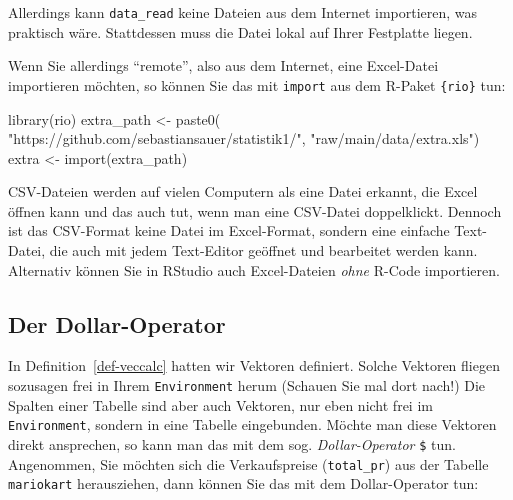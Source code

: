 \documentclass[
  letterpaper,
  oneside,
  open=any]{scrbook}
\newenvironment{Shaded}{\begin{snugshade}}{\end{snugshade}}
\newcommand{\DocumentationTok}[1]{\textcolor[rgb]{0.37,0.37,0.37}{\textit{#1}}}
\newcommand{\FunctionTok}[1]{\textcolor[rgb]{0.28,0.35,0.67}{#1}}
\newcommand{\NormalTok}[1]{\textcolor[rgb]{0.00,0.23,0.31}{#1}}
\newcommand{\OtherTok}[1]{\textcolor[rgb]{0.00,0.23,0.31}{#1}}
\newcommand{\SpecialCharTok}[1]{\textcolor[rgb]{0.37,0.37,0.37}{#1}}
\newcommand{\StringTok}[1]{\textcolor[rgb]{0.13,0.47,0.30}{#1}}
\theoremstyle{definition}
\theoremstyle{definition}
\theoremstyle{definition}
\theoremstyle{remark}
\begin{document}
Allerdings kann \texttt{data\_read} keine Dateien aus dem Internet
importieren, was praktisch wäre. Stattdessen muss die Datei lokal auf
Ihrer Festplatte liegen.

Wenn Sie allerdings \enquote{remote}, also aus dem Internet, eine
Excel-Datei importieren möchten, so können Sie das mit \texttt{import}
aus dem R-Paket \texttt{\{rio\}} tun:

\begin{Shaded}
\begin{Highlighting}[]
\FunctionTok{library}\NormalTok{(rio)}
\NormalTok{extra\_path }\OtherTok{\textless{}{-}} \FunctionTok{paste0}\NormalTok{(}
  \StringTok{"https://github.com/sebastiansauer/statistik1/"}\NormalTok{,}
  \StringTok{"raw/main/data/extra.xls"}\NormalTok{)}
\NormalTok{extra }\OtherTok{\textless{}{-}} \FunctionTok{import}\NormalTok{(extra\_path)}
\end{Highlighting}
\end{Shaded}

CSV-Dateien werden auf vielen Computern als eine Datei erkannt, die
Excel öffnen kann und das auch tut, wenn man eine CSV-Datei
doppelklickt. Dennoch ist das CSV-Format keine Datei im Excel-Format,
sondern eine einfache Text-Datei, die auch mit jedem Text-Editor
geöffnet und bearbeitet werden kann. Alternativ können Sie in RStudio
auch Excel-Dateien \emph{ohne} R-Code importieren.

\subsection{Der Dollar-Operator}\label{sec-dollar-op}

In Definition~\ref{def-veccalc} hatten wir Vektoren definiert. Solche
Vektoren fliegen sozusagen frei in Ihrem \texttt{Environment} herum
(Schauen Sie mal dort nach!) Die Spalten einer Tabelle sind aber auch
Vektoren, nur eben nicht frei im \texttt{Environment}, sondern in eine
Tabelle eingebunden. Möchte man diese Vektoren direkt ansprechen, so
kann man das mit dem sog. \emph{Dollar-Operator} \texttt{\$} tun.
Angenommen, Sie möchten sich die Verkaufspreise (\texttt{total\_pr}) aus
der Tabelle \texttt{mariokart} herausziehen, dann können Sie das mit dem
Dollar-Operator tun:

\begin{Shaded}
\end{Shaded}
\end{document}
